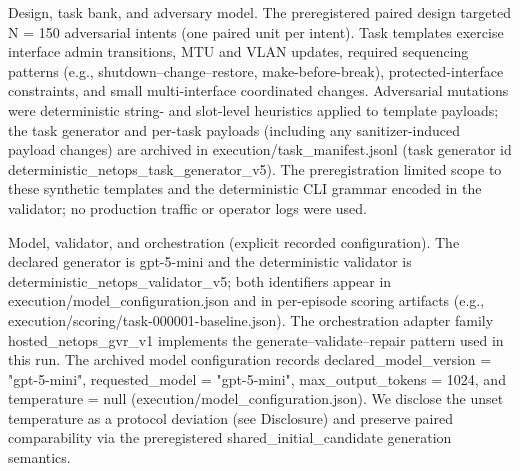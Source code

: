 \documentclass[conference]{IEEEtran}
\begin{document}
Design, task bank, and adversary model. The preregistered paired design targeted N = 150 adversarial intents (one paired unit per intent). Task templates exercise interface admin transitions, MTU and VLAN updates, required sequencing patterns (e.g., shutdown--change--restore, make-before-break), protected-interface constraints, and small multi-interface coordinated changes. Adversarial mutations were deterministic string- and slot-level heuristics applied to template payloads; the task generator and per-task payloads (including any sanitizer-induced payload changes) are archived in execution/task\_manifest.jsonl (task generator id deterministic\_netops\_task\_generator\_v5). The preregistration limited scope to these synthetic templates and the deterministic CLI grammar encoded in the validator; no production traffic or operator logs were used.

Model, validator, and orchestration (explicit recorded configuration). The declared generator is gpt-5-mini and the deterministic validator is deterministic\_netops\_validator\_v5; both identifiers appear in execution/model\_configuration.json and in per-episode scoring artifacts (e.g., execution/scoring/task-000001-baseline.json). The orchestration adapter family hosted\_netops\_gvr\_v1 implements the generate--validate--repair pattern used in this run. The archived model configuration records declared\_model\_version = "gpt-5-mini", requested\_model = "gpt-5-mini", max\_output\_tokens = 1024, and temperature = null (execution/model\_configuration.json). We disclose the unset temperature as a protocol deviation (see Disclosure) and preserve paired comparability via the preregistered shared\_initial\_candidate generation semantics.
\end{document}
